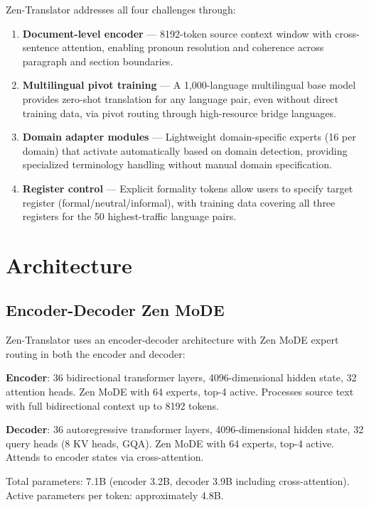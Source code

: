 \documentclass[11pt,a4paper]{article}
\begin{document}
Zen-Translator addresses all four challenges through:

\begin{enumerate}
\item \textbf{Document-level encoder} --- 8192-token source context window with
      cross-sentence attention, enabling pronoun resolution and coherence across
      paragraph and section boundaries.
\item \textbf{Multilingual pivot training} --- A 1,000-language multilingual base
      model provides zero-shot translation for any language pair, even without
      direct training data, via pivot routing through high-resource bridge languages.
\item \textbf{Domain adapter modules} --- Lightweight domain-specific experts
      (16 per domain) that activate automatically based on domain detection, providing
      specialized terminology handling without manual domain specification.
\item \textbf{Register control} --- Explicit formality tokens allow users to specify
      target register (formal/neutral/informal), with training data covering all
      three registers for the 50 highest-traffic language pairs.
\end{enumerate}

\section{Architecture}
\label{sec:arch}

\subsection{Encoder-Decoder Zen MoDE}

Zen-Translator uses an encoder-decoder architecture with Zen MoDE expert routing
in both the encoder and decoder:

\textbf{Encoder}: 36 bidirectional transformer layers, 4096-dimensional hidden state,
32 attention heads. Zen MoDE with 64 experts, top-4 active. Processes source text
with full bidirectional context up to 8192 tokens.

\textbf{Decoder}: 36 autoregressive transformer layers, 4096-dimensional hidden state,
32 query heads (8 KV heads, GQA). Zen MoDE with 64 experts, top-4 active. Attends
to encoder states via cross-attention.

Total parameters: 7.1B (encoder 3.2B, decoder 3.9B including cross-attention).
Active parameters per token: approximately 4.8B.
\end{document}
